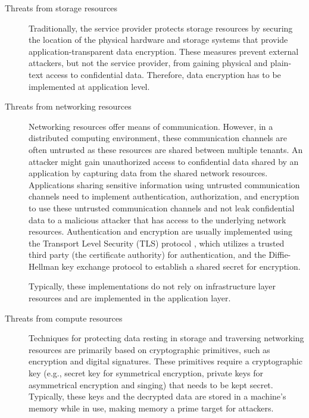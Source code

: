 \begin{description}
  \item[Threats from storage resources]
    Traditionally, the service provider protects storage resources by securing
    the location of the physical hardware and storage systems that provide
    application-transparent data encryption. These measures prevent external
    attackers, but not the service provider, from gaining physical and
    plain-text access to confidential data. Therefore, data encryption has to be
    implemented at application level.

  \item[Threats from networking resources]
    Networking resources offer means of communication. However, in a distributed
    computing environment, these communication channels are often untrusted as
    these resources are shared between multiple tenants. An attacker might gain
    unauthorized access to confidential data shared by an application by
    capturing data from the shared network resources. Applications sharing
    sensitive information using untrusted communication channels need to
    implement authentication, authorization, and encryption to use these
    untrusted communication channels and not leak confidential data to a
    malicious attacker that has access to the underlying network resources.
    Authentication and encryption are usually implemented using the Transport
    Level Security (TLS) protocol \cite{rfc5246}, which utilizes a trusted third
    party (the certificate authority) for authentication, and the Diffie-Hellman
    key exchange protocol to establish a shared secret for encryption.

    Typically, these implementations do not rely on infrastructure layer
    resources and are implemented in the application layer.

  \item[Threats from compute resources]
    Techniques for protecting data resting in storage and traversing networking
    resources are primarily based on cryptographic primitives, such as
    encryption and digital signatures. These primitives require a cryptographic
    key (e.g., secret key for symmetrical encryption, private keys for
    asymmetrical encryption and singing) that needs to be kept secret.
    Typically, these keys and the decrypted data are stored in a machine's
    memory while in use, making memory a prime target for attackers.


\end{description}
